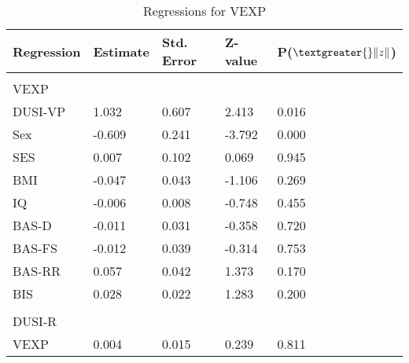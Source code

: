 \documentclass[utf8]{article}
\begin{document}
\begin{table}[]
\begin{tabular}{lllll}
Regression      & Estimate & Std. Error & Z-value & P($\textgreater{}\|z\|$) \\ \hline
                &          &            &         &                          \\
VEXP            &          &            &         &                          \\
DUSI-VP         & 1.032    & 0.607      & 2.413   & 0.016                    \\
Sex             & -0.609   & 0.241      & -3.792  & 0.000                    \\
SES             & 0.007    & 0.102      & 0.069   & 0.945                    \\
BMI             & -0.047   & 0.043      & -1.106  & 0.269                    \\
IQ              & -0.006   & 0.008      & -0.748  & 0.455                    \\
BAS-D           & -0.011   & 0.031      & -0.358  & 0.720                    \\
BAS-FS          & -0.012   & 0.039      & -0.314  & 0.753                    \\
BAS-RR          & 0.057    & 0.042      & 1.373   & 0.170                    \\
BIS             & 0.028    & 0.022      & 1.283   & 0.200                    \\
                &          &            &         &                          \\
DUSI-R          &          &            &         &                          \\ 
VEXP            & 0.004    & 0.015      & 0.239   & 0.811                   
\end{tabular}
\caption{Regressions for VEXP\label{tab:3}}
\end{table}
\end{document}

